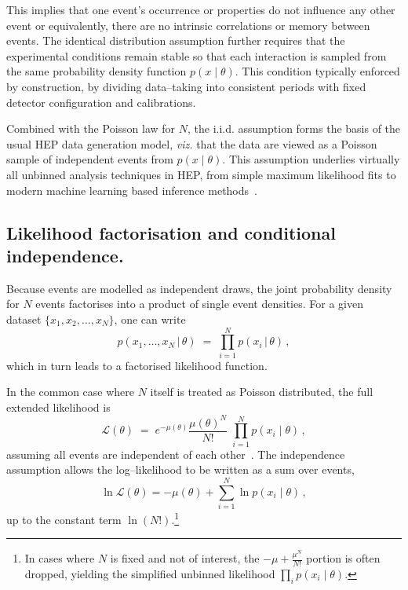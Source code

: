         This implies that one event’s occurrence or properties do not influence any other event or equivalently, there are no intrinsic correlations or memory between events.
        The identical distribution assumption further requires that the experimental conditions remain stable so that each interaction is sampled from the same probability density function $p(x\mid \theta)$.
        This condition typically enforced by construction, by dividing data--taking into consistent periods with fixed detector configuration and calibrations.
        
        Combined with the Poisson law for $N$, the i.i.d. assumption forms the basis of the usual HEP data generation model, \textit{viz.}
        that the data are viewed as a Poisson sample of independent events from $p(x\mid\theta)$.
        This assumption underlies virtually all unbinned analysis techniques in HEP, from simple maximum likelihood fits to modern machine learning based inference methods~\cite{Langenbruch:2025tvd, Weisser:2016cnc, Schofbeck:2024zjo, Brehmer:2020cvb, Stakia:2021pvp}.
        
    \subsection{Likelihood factorisation and conditional independence.}
        Because events are modelled as independent draws, the joint probability density for $N$ events factorises into a product of single event densities.
        For a given dataset $\{x_1, x_2, \dots, x_N\}$, one can write 
        \[
             p(x_1,\ldots,x_N \,|\, \theta) \;=\; \prod_{i=1}^{N} p(x_i \,|\, \theta)\,,
        \] 
        which in turn leads to a factorised likelihood function.
        
        In the common case where $N$ itself is treated as Poisson distributed, the full extended likelihood is 
        \begin{equation}
            \mathcal{L}(\theta) \;=\; e^{-\mu(\theta)} \frac{\mu(\theta)^N}{N!}\;\prod_{i=1}^{N} p(x_i\mid \theta)\,,
            \label{eq:extended-likelihood}
        \end{equation}
        assuming all events are independent of each other~\cite{ParticleDataGroup:2018ovx, cowan_topics_2009, Back2001AFitting, Verkerke2008RooFit2.91, Singh2024MakingRooFit, Segura2024APhysics, scheirich_pleskot_2019}.
        The independence assumption allows the log--likelihood to be written as a sum over events,
        \begin{equation}
            \ln \mathcal{L}(\theta) = -\mu(\theta) + \sum_{i=1}^{N} \ln p(x_i\mid\theta)\,,
            \label{eq:loglik-sum}
        \end{equation}
        up to the constant term $\ln(N!)$.\footnote{In cases where $N$ is fixed and not of interest, the $-\mu + \frac{\mu^N}{N!}$ portion is often dropped, yielding the simplified unbinned likelihood $\prod_{i}p(x_i\mid\theta)$.}
        
